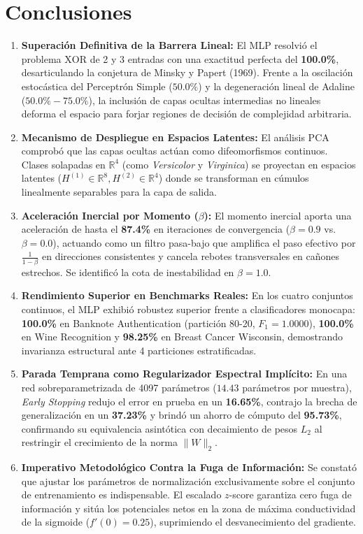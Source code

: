 \documentclass{article}
\begin{document}
\section{Conclusiones}
\label{sec:conclusiones}

\begin{enumerate}
    \item \textbf{Superación Definitiva de la Barrera Lineal:} El MLP resolvió el problema $\text{XOR}$ de 2 y 3 entradas con una exactitud perfecta del \textbf{100.0\%}, desarticulando la conjetura de Minsky y Papert (1969). Frente a la oscilación estocástica del Perceptrón Simple ($50.0\%$) y la degeneración lineal de Adaline ($50.0\%-75.0\%$), la inclusión de capas ocultas intermedias no lineales deforma el espacio para forjar regiones de decisión de complejidad arbitraria.
    \item \textbf{Mecanismo de Despliegue en Espacios Latentes:} El análisis PCA comprobó que las capas ocultas actúan como difeomorfismos continuos. Clases solapadas en $\mathbb{R}^4$ (como \textit{Versicolor} y \textit{Virginica}) se proyectan en espacios latentes ($H^{(1)} \in \mathbb{R}^8, H^{(2)} \in \mathbb{R}^4$) donde se transforman en cúmulos linealmente separables para la capa de salida.
    \item \textbf{Aceleración Inercial por Momento ($\beta$):} El momento inercial aporta una aceleración de hasta el \textbf{87.4\%} en iteraciones de convergencia ($\beta=0.9$ vs. $\beta=0.0$), actuando como un filtro pasa-bajo que amplifica el paso efectivo por $\frac{1}{1-\beta}$ en direcciones consistentes y cancela rebotes transversales en cañones estrechos. Se identificó la cota de inestabilidad en $\beta=1.0$.
    \item \textbf{Rendimiento Superior en Benchmarks Reales:} En los cuatro conjuntos continuos, el MLP exhibió robustez superior frente a clasificadores monocapa: \textbf{100.0\%} en Banknote Authentication (partición 80-20, $F_1=1.0000$), \textbf{100.0\%} en Wine Recognition y \textbf{98.25\%} en Breast Cancer Wisconsin, demostrando invarianza estructural ante 4 particiones estratificadas.
    \item \textbf{Parada Temprana como Regularizador Espectral Implícito:} En una red sobreparametrizada de 4097 parámetros ($14.43$ parámetros por muestra), \textit{Early Stopping} redujo el error en prueba en un \textbf{16.65\%}, contrajo la brecha de generalización en un \textbf{37.23\%} y brindó un ahorro de cómputo del \textbf{95.73\%}, confirmando su equivalencia asintótica con decaimiento de pesos $L_2$ al restringir el crecimiento de la norma $\|W\|_2$.
    \item \textbf{Imperativo Metodológico Contra la Fuga de Información:} Se constató que ajustar los parámetros de normalización exclusivamente sobre el conjunto de entrenamiento es indispensable. El escalado $z$-score garantiza cero fuga de información y sitúa los potenciales netos en la zona de máxima conductividad de la sigmoide ($f'(0)=0.25$), suprimiendo el desvanecimiento del gradiente.
\end{enumerate}
\end{document}
